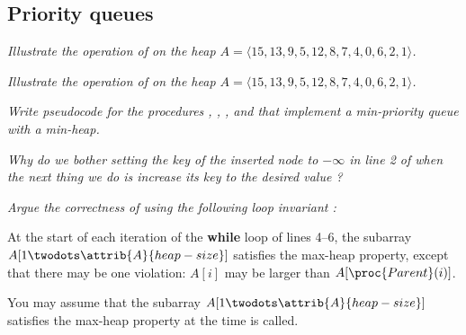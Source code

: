 \subsection{Priority queues}

\begin{description}
     \textit{Illustrate the operation of  on the heap $A = \langle 15, 13, 9, 5, 12, 8, 7, 4, 0, 6, 2,1 \rangle$.}
        \begin{exrev}
          
        \end{exrev}
     \textit{Illustrate the operation of  on the heap $A = \langle 15, 13, 9, 5, 12, 8, 7, 4, 0, 6, 2,1 \rangle$.}
        \begin{exrev}
          
        \end{exrev}
     \textit{Write pseudocode for the procedures , , , and  that implement a min-priority queue with a min-heap.}
        \begin{exrev}
          
        \end{exrev}
     \textit{Why do we bother setting the key of the inserted node to $-\infty$ in line 2 of  when the next thing we do is increase its key to the desired value ?}
        \begin{exrev}
          
        \end{exrev}
     {\itshape Argue the correctness of  using the following loop invariant :

At the start of each iteration of the \textbf{while} loop of lines 4–6, the subarray
$A[1 \twodots \attrib{A}{heap-size}]$ satisfies the max-heap property, except that there may
be one violation: $A[i]$ may be larger than $A[\proc{Parent}(i)]$.

You may assume that the subarray $A[1 \twodots \attrib{A}{heap-size}]$ satisfies the max-heap property at the time  is called.
}

        \begin{exrev}
          
        \end{exrev}
     \textit{}
        \begin{exrev}
          
        \end{exrev}
     \textit{}
        \begin{exrev}
          
        \end{exrev}
     \textit{}
        \begin{exrev}
          
        \end{exrev}
     \textit{}
        \begin{exrev}
          
        \end{exrev}
\end{description}

